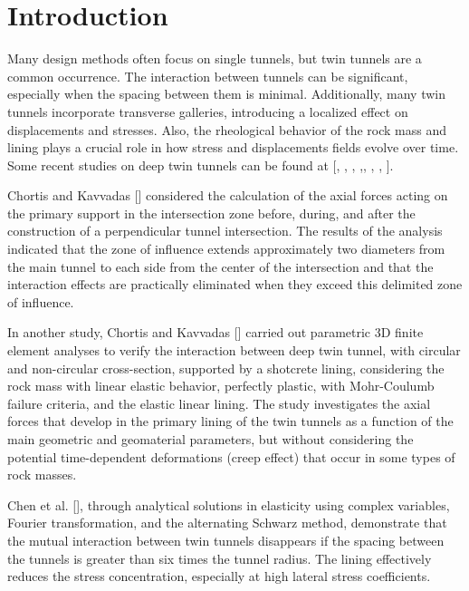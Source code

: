 \documentclass[a4paper,fleqn]{cas-sc}
\begin{document}
\maketitle

\section{Introduction}\label{}

Many design methods often focus on single tunnels, but twin tunnels are a common occurrence. The interaction between tunnels can be significant, especially when the spacing between them is minimal. Additionally, many twin tunnels incorporate transverse galleries, introducing a localized effect on displacements and stresses. Also, the rheological behavior of the rock mass and lining plays a crucial role in how stress and displacements fields evolve over time. Some recent studies on deep twin tunnels can be found at [, , , ,, , , ].

Chortis and Kavvadas [] considered the calculation of the axial forces acting on the primary support in the intersection zone before, during, and after the construction of a perpendicular tunnel intersection. The results of the analysis indicated that the zone of influence extends approximately two diameters from the main tunnel to each side from the center of the intersection and that the interaction effects are practically eliminated when they exceed this delimited zone of influence. 

In another study, Chortis and Kavvadas [] carried out parametric 3D finite element analyses to verify the interaction between deep twin tunnel, with circular and non-circular cross-section, supported by a shotcrete lining, considering the rock mass with linear elastic behavior, perfectly plastic, with Mohr-Coulumb failure criteria, and the elastic linear lining. The study investigates the axial forces that develop in the primary lining of the twin tunnels as a function of the main geometric and geomaterial parameters, but without considering the potential time-dependent deformations (creep effect) that occur in some types of rock masses.

Chen et al. [], through analytical solutions in elasticity using complex variables, Fourier transformation, and the alternating Schwarz method, demonstrate that the mutual interaction between twin tunnels disappears if the spacing between the tunnels is greater than six times the tunnel radius. The lining effectively reduces the stress concentration, especially at high lateral stress coefficients.
\end{document}
